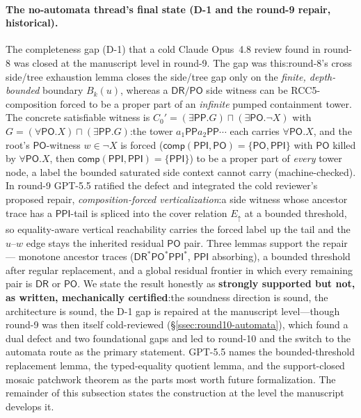 \documentclass[
]{ceurart}
\theoremstyle{definition}
\newcommand{\DR}{\ensuremath{\mathsf{DR}}}
\newcommand{\PO}{\ensuremath{\mathsf{PO}}}
\newcommand{\PP}{\ensuremath{\mathsf{PP}}}
\newcommand{\PPI}{\ensuremath{\mathsf{PPI}}}
\newcommand{\comp}{\ensuremath{\mathsf{comp}}}
\newcommand{\Eup}{\ensuremath{E_{\uparrow}}}
\begin{document}
\paragraph{The no-automata thread's final state (D-1 and the round-9
repair, historical).}
The completeness gap (D-1) that a cold Claude Opus~4.8 review found
in round-8 was closed at the manuscript level in round-9.  The gap
was this:\@ round-8's cross side/tree exhaustion lemma closes the
side/tree gap only on the \emph{finite, depth-bounded} boundary
$B_k(u)$, whereas a $\DR/\PO$ side witness can be RCC5-composition
forced to be a proper part of an \emph{infinite} pumped containment
tower.  The concrete satisfiable witness is
$C_0'=(\exists\PP.G)\sqcap(\exists\PO.\neg X)$ with
$G=(\forall\PO.X)\sqcap(\exists\PP.G)$:\@ the tower
$a_1\PP a_2\PP\cdots$ each carries $\forall\PO.X$, and the root's
$\PO$-witness $w\in\neg X$ is forced ($\comp(\PPI,\PO)=\{\PO,\PPI\}$
with $\PO$ killed by $\forall\PO.X$, then $\comp(\PPI,\PPI)=\{\PPI\}$)
to be a proper part of \emph{every} tower node, a label the bounded
saturated side context cannot carry (machine-checked).  In round-9
GPT-5.5 ratified the defect and integrated the cold reviewer's
proposed repair, \emph{composition-forced verticalization}:\@ a
side witness whose ancestor trace has a $\PPI$-tail is spliced into
the cover relation $\Eup$ at a bounded threshold, so equality-aware
vertical reachability carries the forced label up the tail and the
$u$--$w$ edge stays the inherited residual $\PO$ pair.  Three lemmas
support the repair --- monotone ancestor traces ($\DR^*\PO^*\PPI^*$,
$\PPI$ absorbing), a bounded threshold after regular replacement,
and a global residual frontier in which every remaining pair is
$\DR$ or $\PO$.  We state the result honestly as \textbf{strongly
supported but not, as written, mechanically certified}:\@ the
soundness direction is sound, the architecture is sound, the D-1 gap
is repaired at the manuscript level---though round-9 was then itself
cold-reviewed (\S\ref{ssec:round10-automata}), which found a dual
defect and two foundational gaps and led to round-10 and the switch to
the automata route as the primary statement.  GPT-5.5 names the bounded-threshold
replacement lemma, the typed-equality quotient lemma, and the
support-closed mosaic patchwork theorem as the parts most worth
future formalization.  The remainder of this subsection states the
construction at the level the manuscript develops it.
\end{document}
